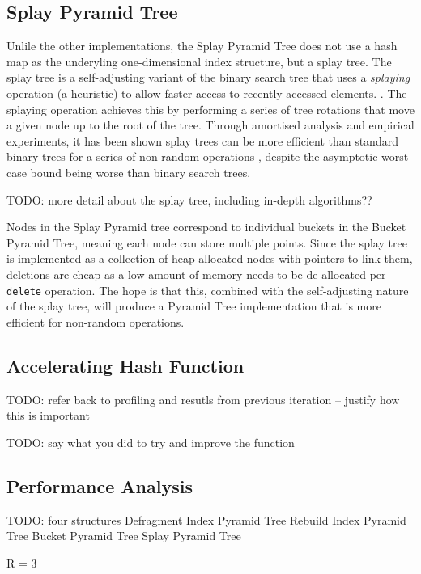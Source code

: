 \subsection{Splay Pyramid Tree}

Unlile the other implementations, the Splay Pyramid Tree does not use a hash map as the underyling one-dimensional index structure, but a splay tree. The splay tree is a self-adjusting variant of the binary search tree that uses a \textit{splaying} operation (a heuristic) to allow faster access to recently accessed elements. \cite{splay-tree}. The splaying operation achieves this by performing a series of tree rotations that move a given node up to the root of the tree. Through amortised analysis and empirical experiments, it has been shown splay trees can be more efficient than standard binary trees for a series of non-random operations \cite{splay-tree, TODO}, despite the asymptotic worst case bound being worse than binary search trees.

TODO: more detail about the splay tree, including in-depth algorithms??

Nodes in the Splay Pyramid tree correspond to individual buckets in the Bucket Pyramid Tree, meaning each node can store multiple points. Since the splay tree is implemented as a collection of heap-allocated nodes with pointers to link them, deletions are cheap as a low amount of memory needs to be de-allocated per \texttt{delete} operation. The hope is that this, combined with the self-adjusting nature of the splay tree, will produce a Pyramid Tree implementation that is more efficient for non-random operations.

\subsection{Accelerating Hash Function}

TODO: refer back to profiling and resutls from previous iteration -- justify how this is important

TODO: say what you did to try and improve the function

\subsection{Performance Analysis}

TODO: four structures
	Defragment Index Pyramid Tree
	Rebuild Index Pyramid Tree
	Bucket Pyramid Tree
	Splay Pyramid Tree

	R = 3

